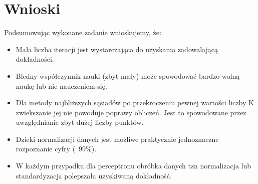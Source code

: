 \documentclass{classrep}
\begin{document}
    \section{Wnioski}
    {
        Podsumowując wykonane zadanie wnioskujemy, że:
        \begin{itemize}
            \item Mała liczba iteracji jest wystarczająca do uzyskania zadowalającą dokładności.
            \item Bledny współczynnik nauki (zbyt mały) może spowodować bardzo wolną naukę lub
            nie nauczeniem się.
            \item Dla metody najbliższych sąsiadów po przekroczeniu pewnej wartości liczby K zwiekszanie jej nie
            powoduje poprawy obliczeń. Jest to spowodowane przez uwzględnianie zbyt dużej liczby punktów.
            \item Dzieki normalizacji danych jest możliwe praktycznie jednoznaczne rozpoznanie cyfry (~99\%).
            \item W każdym przypadku dla perceptronu obróbka danych tzn normalizacja lub standardyzacja polepszała
            uzyskiwaną dokładność.
        \end{itemize}
    }
    \begin{thebibliography}{0}
    \end{thebibliography}
\end{document}
